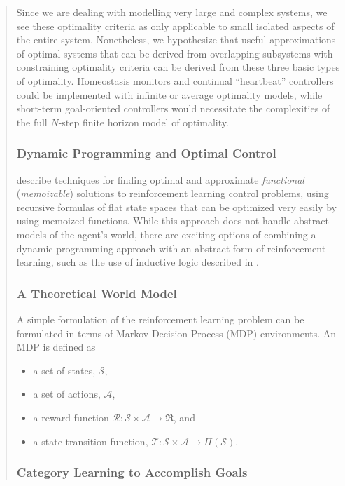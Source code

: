 \begin{quotation}
Since we are dealing with modelling very large and complex systems, we see these optimality criteria as only applicable to small isolated aspects of the entire system.
Nonetheless, we hypothesize that useful approximations of optimal systems that can be derived from overlapping subsystems with constraining optimality criteria can be derived from these three basic types of optimality.
Homeostasis monitors and continual ``heartbeat'' controllers could be implemented with infinite or average optimality models, while short-term goal-oriented controllers would necessitate the complexities of the full $N$-step finite horizon model of optimality.

\subsubsection{Dynamic Programming and Optimal Control}

\cite{bertsekas2001dpa} describe techniques for finding optimal and approximate \emph{functional} (\emph{memoizable}) solutions to reinforcement learning control problems, using recursive formulas of flat state spaces that can be optimized very easily by using memoized functions.
While this approach does not handle abstract models of the agent's world, there are exciting options of combining a dynamic programming approach with an abstract form of reinforcement learning, such as the use of inductive logic described in \cite{dvzeroski2001rrl}.

\subsubsection{A Theoretical World Model}

A simple formulation of the reinforcement learning problem can be formulated in terms of Markov Decision Process (MDP) environments.
An MDP is defined as

\begin{itemize}
\item{a set of states, $\mathcal{S}$,}
\item{a set of actions, $\mathcal{A}$,}
\item{a reward function $\mathcal{R}:\mathcal{S}\times\mathcal{A}\rightarrow\Re$, and}
\item{a state transition function, $\mathcal{T}:\mathcal{S}\times\mathcal{A}\rightarrow\Pi{(\mathcal{S})}$.}
\end{itemize}

\subsubsection{Category Learning to Accomplish Goals}


\end{quotation}
